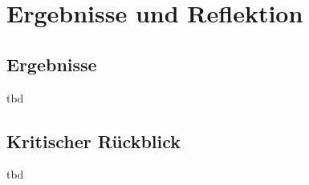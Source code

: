 
\newpage


\section{Ergebnisse und Reflektion}

\subsection{Ergebnisse}
\color{red}
tbd
\color{black}

\subsection{Kritischer Rückblick}
\color{red}
tbd
\color{black}
